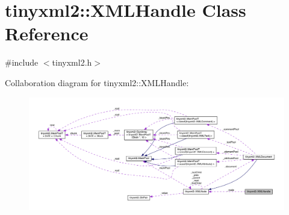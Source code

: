 \hypertarget{classtinyxml2_1_1_x_m_l_handle}{}\section{tinyxml2\+:\+:X\+M\+L\+Handle Class Reference}
\label{classtinyxml2_1_1_x_m_l_handle}


{\ttfamily \#include $<$tinyxml2.\+h$>$}



Collaboration diagram for tinyxml2\+:\+:X\+M\+L\+Handle\+:\nopagebreak
\begin{figure}[H]
\begin{center}
\leavevmode
\includegraphics[width=350pt]{classtinyxml2_1_1_x_m_l_handle__coll__graph}
\end{center}
\end{figure}
